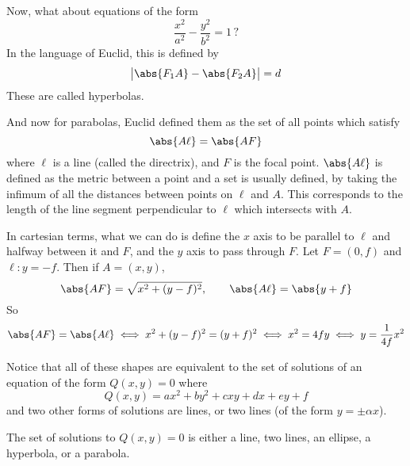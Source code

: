\documentclass[10pt]{article}
\begin{document}
Now, what about equations of the form
\[ \frac{x^2}{a^2} - \frac{y^2}{b^2} = 1\,? \]
In the language of Euclid, this is defined by
\[ \bigl\lvert\abs{F_1A} - \abs{F_2A}\bigr\rvert = d \]
These are called hyperbolas.

And now for parabolas, Euclid defined them as the set of all points which satisfy
\[ \abs{A\ell} = \abs{AF} \]
where $\ell$ is a line (called the directrix), and $F$ is the focal point.
$\abs{A\ell}$ is defined as the metric between a point and a set is usually defined, by taking the infimum of all the distances between points on $\ell$ and $A$.
This corresponds to the length of the line segment perpendicular to $\ell$ which intersects with $A$.

In cartesian terms, what we can do is define the $x$ axis to be parallel to $\ell$ and halfway between it and $F$, and the $y$ axis to pass through $F$.
Let $F=(0,f)$ and $\ell\colon y=-f$.
Then if $A=(x,y)$,
\[ \abs{AF} = \sqrt{x^2+(y-f)^2},\qquad \abs{A\ell} = \abs{y+f} \]
\newpage
So
\[ \abs{AF} = \abs{A\ell} \iff x^2+(y-f)^2 = (y+f)^2 \iff x^2 = 4fy \iff y = \frac1{4f}x^2 \]

Notice that all of these shapes are equivalent to the set of solutions of an equation of the form $Q(x,y)=0$ where
\[ Q(x,y) = ax^2 + by^2 + cxy + dx + ey + f \]
and two other forms of solutions are lines, or two lines (of the form $y=\pm\alpha x$).

\begin{prop*}

    The set of solutions to $Q(x,y)=0$ is either a line, two lines, an ellipse, a hyperbola, or a parabola.

\end{prop*}
\end{document}
